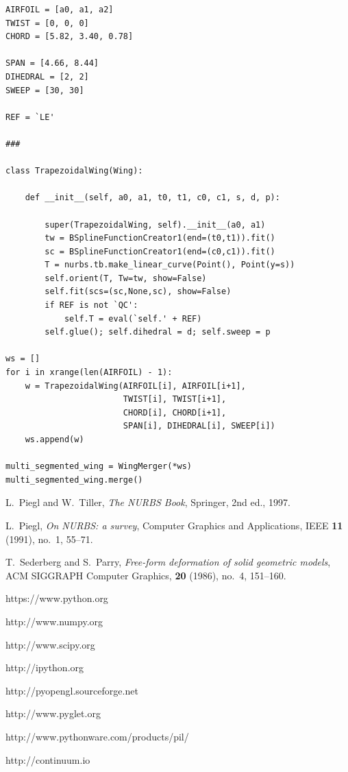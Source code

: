 \documentclass[]{article}
\begin{document}
\begin{verbatim}
AIRFOIL = [a0, a1, a2]
TWIST = [0, 0, 0]
CHORD = [5.82, 3.40, 0.78]

SPAN = [4.66, 8.44]
DIHEDRAL = [2, 2]
SWEEP = [30, 30]

REF = `LE'

###

class TrapezoidalWing(Wing):

    def __init__(self, a0, a1, t0, t1, c0, c1, s, d, p):

        super(TrapezoidalWing, self).__init__(a0, a1)
        tw = BSplineFunctionCreator1(end=(t0,t1)).fit()
        sc = BSplineFunctionCreator1(end=(c0,c1)).fit()
        T = nurbs.tb.make_linear_curve(Point(), Point(y=s))
        self.orient(T, Tw=tw, show=False)
        self.fit(scs=(sc,None,sc), show=False)
        if REF is not `QC':
            self.T = eval(`self.' + REF)
        self.glue(); self.dihedral = d; self.sweep = p

ws = []
for i in xrange(len(AIRFOIL) - 1):
    w = TrapezoidalWing(AIRFOIL[i], AIRFOIL[i+1],
                        TWIST[i], TWIST[i+1],
                        CHORD[i], CHORD[i+1],
                        SPAN[i], DIHEDRAL[i], SWEEP[i])
    ws.append(w)

multi_segmented_wing = WingMerger(*ws)
multi_segmented_wing.merge()
\end{verbatim}


\newpage
\begin{thebibliography}{99}

  L.\ Piegl and W.\ Tiller,
  \emph{The NURBS Book},
  Springer,
  2nd ed.,
  1997.

  L.\ Piegl,
  \emph{On NURBS: a survey},
  Computer Graphics and Applications, IEEE
  \textbf{11} (1991),
  no.\ 1,
  55--71.

  T.\ Sederberg and S.\ Parry,
  \emph{Free-form deformation of solid geometric models},
  ACM SIGGRAPH Computer Graphics,
  \textbf{20} (1986),
  no.\ 4,
  151--160.

  https://www.python.org

  http://www.numpy.org

  http://www.scipy.org

  http://ipython.org

  http://pyopengl.sourceforge.net

  http://www.pyglet.org

  http://www.pythonware.com/products/pil/

  http://continuum.io

\end{thebibliography}
\end{document}
